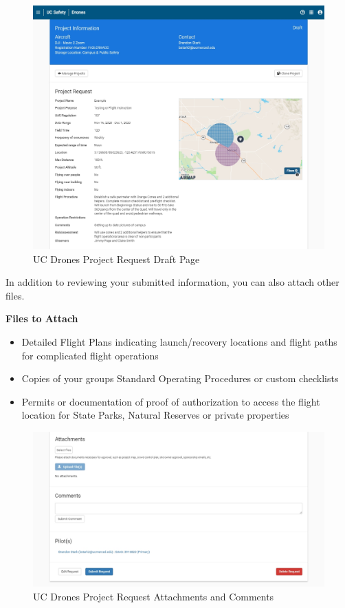 \documentclass[
]{book}
\providecommand{\tightlist}{%
  \setlength{\itemsep}{0pt}\setlength{\parskip}{0pt}}
\begin{document}
\begin{figure}

{\centering \includegraphics[width=0.95\linewidth]{images/UCDrones_project_draft} 

}

\caption{UC Drones Project Request Draft Page}\label{fig:UCDrones-project-draft}
\end{figure}

In addition to reviewing your submitted information, you can also attach other files.

\textbf{Files to Attach}

\begin{itemize}
\tightlist
\item
  Detailed Flight Plans indicating launch/recovery locations and flight paths for complicated flight operations
\item
  Copies of your groups Standard Operating Procedures or custom checklists
\item
  Permits or documentation of proof of authorization to access the flight location for State Parks, Natural Reserves or private properties
\end{itemize}

\begin{figure}

{\centering \includegraphics[width=0.95\linewidth]{images/UCDrones_project_comments} 

}

\caption{UC Drones Project Request Attachments and Comments}\label{fig:UCDrones-project-comments}
\end{figure}
\end{document}
